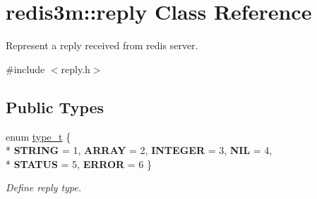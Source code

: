 \hypertarget{classredis3m_1_1reply}{\section{redis3m\-:\-:reply Class Reference}
\label{classredis3m_1_1reply}
}


Represent a reply received from redis server.  




{\ttfamily \#include $<$reply.\-h$>$}

\subsection*{Public Types}
\begin{DoxyCompactItemize}
\item 
enum \hyperlink{classredis3m_1_1reply_ac44942a4ec175e767ce119d452ffafd6}{type\-\_\-t} \{ \\*
{\bfseries S\-T\-R\-I\-N\-G} = 1, 
{\bfseries A\-R\-R\-A\-Y} = 2, 
{\bfseries I\-N\-T\-E\-G\-E\-R} = 3, 
{\bfseries N\-I\-L} = 4, 
\\*
{\bfseries S\-T\-A\-T\-U\-S} = 5, 
{\bfseries E\-R\-R\-O\-R} = 6
 \}
\begin{DoxyCompactList}\small\item\em Define reply type. \end{DoxyCompactList}\end{DoxyCompactItemize}
